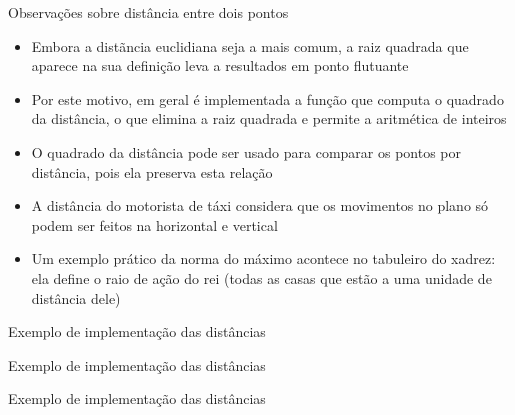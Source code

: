 \begin{frame}[fragile]{Observações sobre distância entre dois pontos}

    \begin{itemize}
        \item Embora a distãncia euclidiana seja a mais comum, a raiz quadrada que aparece na
            sua definição leva a resultados em ponto flutuante

        \item Por este motivo, em geral é implementada a função que computa o quadrado da
            distância, o que elimina a raiz quadrada e permite a aritmética de inteiros

        \item O quadrado da distância pode ser usado para comparar os pontos por distância, pois
            ela preserva esta relação

        \item A distância do motorista de táxi considera que os movimentos no plano só podem ser
            feitos na horizontal e vertical

        \item Um exemplo prático da norma do máximo acontece no tabuleiro do xadrez: ela define o
            raio de ação do rei (todas as casas que estão a uma unidade de distância dele)
    \end{itemize}

\end{frame}

\begin{frame}[fragile]{Exemplo de implementação das distâncias}
\end{frame}

\begin{frame}[fragile]{Exemplo de implementação das distâncias}
\end{frame}

\begin{frame}[fragile]{Exemplo de implementação das distâncias}
\end{frame}

